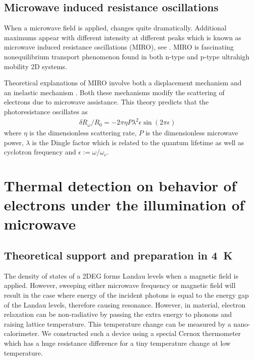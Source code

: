 \documentclass[12pt]{ruthesis}
\begin{document}
\section{Microwave induced resistance oscillations}\label{MIRO}

When a microwave field is applied,  changes quite dramatically.
Additional maximums appear with different intensity at different peaks which is known as microwave induced resistance oscillations (MIRO), see .
MIRO is fascinating nonequilibrium transport phenomenon found in both n-type and p-type ultrahigh mobility 2D systems. 


 
Theoretical explanations of MIRO involve both a displacement mechanism and an inelastic mechanism \cite{PhysRevB.89.125401}.
Both these mechanisms modify the scattering of electrons due to microwave assistance. This theory predicts that the photoresistance oscillates as
\begin{align}
\delta R_{\omega}/R_{0} =-2\pi\eta P\lambda^{2}\epsilon \sin(2\pi\epsilon)
\end{align} 
where $\eta$ is the dimensionless scattering rate, $P$ is the dimensionless microwave power, $\lambda$ is the Dingle factor which is related to the quantum lifetime as well as cyclotron frequency and $\epsilon :=\omega/\omega_{c}$. 



\chapter{Thermal detection on behavior of electrons under the illumination of microwave}\label{Thermal}





\section{Theoretical support and preparation in \SI{4}{K}}\label{Theoretical}

The density of states of a 2DEG forms Landau levels when a magnetic field is applied.
However, sweeping either microwave frequency or magnetic field will result in the case where energy of the incident photons is equal to the energy gap of the Landau levels, therefore causing resonance.
However, in  material, electron relaxation can be non-radiative by passing the extra energy to phonons and raising lattice temperature.
This temperature change can be measured by a nano-calorimeter.
We constructed such a device using a special Cernox thermometer which has a huge resistance difference for a tiny temperature change at low temperature.
\end{document}
